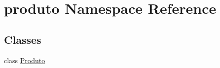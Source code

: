 \hypertarget{namespaceproduto}{}\section{produto Namespace Reference}
\label{namespaceproduto}
\subsection*{Classes}
\begin{DoxyCompactItemize}
\item 
class \hyperlink{classproduto_1_1Produto}{Produto}
\end{DoxyCompactItemize}
